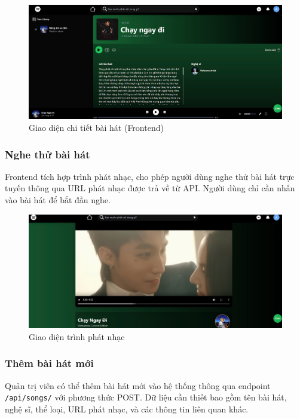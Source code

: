 \begin{figure}[H]
    \centering
    \includegraphics[width=1\textwidth]{imgs/frontend-song-detail.jpg}
    \caption{Giao diện chi tiết bài hát (Frontend)}
\end{figure}

\subsubsection{Nghe thử bài hát}
Frontend tích hợp trình phát nhạc, cho phép người dùng nghe thử bài hát trực tuyến thông qua URL phát nhạc được trả về từ API. Người dùng chỉ cần nhấn vào bài hát để bắt đầu nghe.

\begin{figure}[H]
    \centering
    \includegraphics[width=1\textwidth]{imgs/frontend-player.jpg}
    \caption{Giao diện trình phát nhạc}
\end{figure}

\subsubsection{Thêm bài hát mới}
Quản trị viên có thể thêm bài hát mới vào hệ thống thông qua endpoint \texttt{/api/songs/} với phương thức POST. Dữ liệu cần thiết bao gồm tên bài hát, nghệ sĩ, thể loại, URL phát nhạc, và các thông tin liên quan khác.

